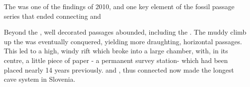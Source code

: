 \begin{marginfigure}
	\checkoddpage \ifoddpage \forcerectofloat \else \forceversofloat \fi
	\centering	{} 
  	\caption{The \protect{} was one of the findings of 2010, and one key element of the fossil passage series that ended connecting \protect{} and \protect{} }
	\end{marginfigure}



Beyond the , well decorated passages abounded, including the . The muddy climb up the  was eventually conquered, yielding more draughting, horizontal passages. This led to a high, windy rift which broke into a large chamber, with, in its centre, a little piece of paper - a permanent survey station- which had been placed nearly 14 years previously.  and , thus connected now made the longest cave system in Slovenia.

